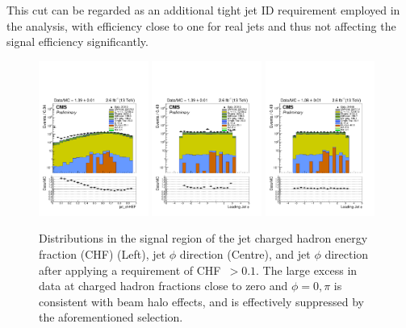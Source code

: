 This cut can be regarded as 
an additional tight jet ID requirement employed in the analysis, 
with efficiency close to one for real jets and thus not affecting the 
signal efficiency significantly. 


\begin{figure}[h!]
    \begin{center}
        {\includegraphics[width=0.32\textwidth]{figures/selection/jet_chHEF_mono_all_before.pdf}}
        {\includegraphics[width=0.32\textwidth]{figures/selection/jet_phi[0]_mono_all_before.pdf}}
        {\includegraphics[width=0.32\textwidth]{figures/selection/jet_phi[0]_mono_all_after.pdf}}
        \caption{Distributions in the signal region of the jet charged hadron
        energy fraction (CHF) (Left), jet $\phi$ direction (Centre), and jet $\phi$
        direction after applying a requirement of {CHF~$>0.1$}. The large excess in data
        at charged hadron fractions close to zero and ${\phi = 0, \pi}$ is consistent with beam
        halo effects, and is effectively suppressed by the aforementioned selection.}
        \label{fig:leadJetCleaning}
    \end{center}
\end{figure}


